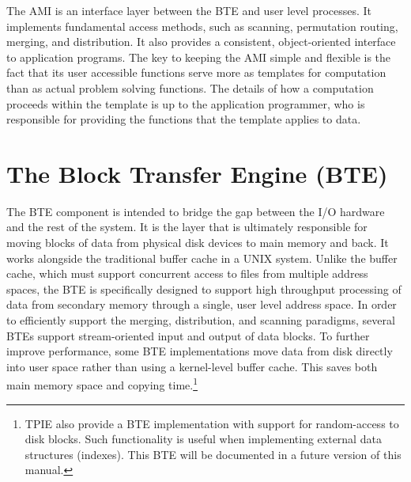 
The AMI is an interface layer between
the BTE and user level processes.  It implements fundamental access
methods, such as scanning, permutation routing, merging, and
distribution. It also provides a consistent, object-oriented interface
to application programs.
The key to keeping the AMI simple and flexible is the fact that its
user accessible functions serve more as templates for computation than
as actual problem solving functions.  The details of how a computation
proceeds within the template is up to the application programmer, who
is responsible for providing the functions that the template applies
to data.

\section{The Block Transfer Engine (BTE)}



The BTE component is intended to bridge the gap between the I/O
hardware and the rest of the system. It is the layer that is
ultimately responsible for moving blocks of data from physical disk
devices to main memory and back. It works alongside the traditional
buffer cache in a UNIX system.  Unlike the buffer
cache, which must support concurrent access to files from multiple
address spaces, the BTE is specifically designed to support high
throughput processing of data from secondary memory through a single,
user level address space. In order to efficiently support the merging,
distribution, and scanning paradigms, several BTEs support
stream-oriented input and output of data blocks. To further improve
performance, some BTE implementations move data from disk directly
into user space rather than using a kernel-level buffer
cache.  This saves both main memory space and
copying time.\footnote{TPIE also provide a BTE implementation with
support for random-access to disk blocks. Such functionality is useful
when implementing external data structures (indexes). This BTE will be
documented in a future version of this manual.}
 
